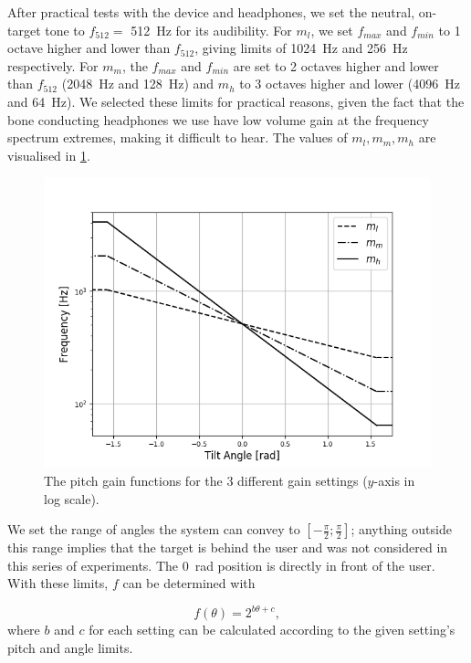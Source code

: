 \documentclass[sigconf, screen=true, anonymous=true]{acmart}
\begin{document}
After practical tests with the device and headphones, we set the neutral, on-target tone to $f_{512} =$ \SI{512}{\hertz} for its audibility.
For $m_l$, we set $f_{max}$ and $f_{min}$ to 1 octave higher and lower than $f_{512}$, giving limits of \SI{1024}{\hertz} and \SI{256}{\hertz} respectively.
For $m_m$, the $f_{max}$ and $f_{min}$ are set to 2 octaves higher and lower than $f_{512}$ (\SI{2048}{\hertz} and \SI{128}{\hertz}) and $m_h$ to 3 octaves higher and lower (\SI{4096}{\hertz} and \SI{64}{\hertz}).
We selected these limits for practical reasons, given the fact that the bone conducting headphones we use have low volume gain at the frequency spectrum extremes, making it difficult to hear. 
The values of $m_l, m_m, m_h$ are visualised in \cref{fig:pitch-gain}.

\begin{figure}
  \centering
  \includegraphics[clip, trim=0 0 0 40, width=1.0\columnwidth]{figures/pitch_gain_functions.png}
  \caption{The pitch gain functions for the 3 different gain settings ($y$-axis in log scale). }\label{fig:pitch-gain}
\end{figure}

We set the range of angles the system can convey to $[-\frac{\pi}{2}; \frac{\pi}{2}]$; anything outside this range implies that the target is behind the user and was not considered in this series of experiments. 
The \SI{0}{\radian} position is directly in front of the user.
With these limits, $f$ can be determined with 

\begin{equation}\label{eq:frequency}
  f(\theta) = 2^{b\theta + c},
\end{equation}
where $b$ and $c$ for each setting can be calculated according to the given setting's pitch and angle limits.%
\end{document}
